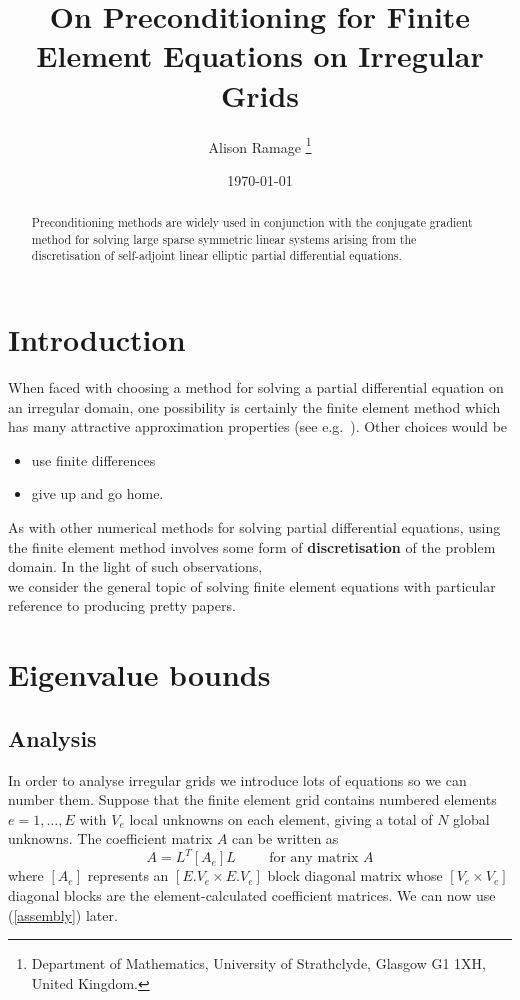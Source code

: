 \documentclass[12pt]{article}
\title{On Preconditioning for Finite Element Equations
 on Irregular Grids}
\author{Alison Ramage 
        \thanks{Department of Mathematics, University of Strathclyde,
        Glasgow G1 1XH, United Kingdom.}}
\date{\today}
\newcommand{\fe}{finite element }
\begin{document}
\maketitle

\begin{abstract}
Preconditioning methods are widely used in conjunction with the
conjugate gradient method for solving large sparse symmetric linear systems
arising from the discretisation of self-adjoint linear elliptic
partial differential equations.
\end{abstract}

\section{Introduction}
\setcounter{equation}{0}
When faced with choosing a method for 
solving a partial differential 
equation on an                      irregular domain, one 
              possibility is certainly the 
finite element method which has many attractive approximation properties
(see e.g.\ \cite{SF73}). Other choices would be
\begin{itemize}
\item use finite differences
\item give up and go home.
\end{itemize}
 As with other numerical methods for solving 
partial differential equations, using the finite element method involves
some form of \textbf{discretisation} of the problem domain. 
In the light of such observations,\\ we 
consider the general topic of %
solving finite element equations with particular reference to 
producing  pretty papers.

\section{Eigenvalue bounds}
\setcounter{equation}{0}
\subsection{Analysis}
In order to analyse irregular grids we introduce lots of equations
so we can number them. Suppose that the \fe
grid contains numbered elements $e=1,\ldots,E$ with $V_e$
local unknowns on each element, giving a total of $N$
global unknowns. The coefficient matrix
$A$ can be written as
\begin{equation}
\label{assembly}
A=L^T[A_e]L\hspace{1cm}\mbox{for any matrix}\,\,A
\end{equation}
where $[A_e]$ represents an $[E.V_e \times E.V_e]$ block 
diagonal matrix whose $[V_e \times V_e]$ diagonal blocks
are the element-calculated coefficient matrices. We can now use
(\ref{assembly}) later.
\end{document}
